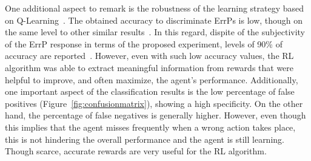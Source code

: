 \documentclass[journal]{IEEEtran}
\begin{document}
{{One additional aspect to remark is the robustness of the learning strategy based on Q-Learning~\cite{Bauer2015,Rubin2012}.   The obtained accuracy to discriminate ErrPs is low, though on the same level to other similar results~\cite{Iturrate2013,Ehrlich2016}.  In this regard, dispite of the subjectivity of the ErrP response in terms of the proposed experiment, levels of 90\% of accuracy are reported~\cite{Chavarriaga2014}.  However, even with such low accuracy values, the RL algorithm was able to extract meaningful information from rewards that were helpful to improve, and often maximize, the agent's performance.  Additionally, one important aspect of the classification results is the low percentage of false positives (Figure~\ref{fig:confusionmatrix}), showing a high specificity. On the other hand, the percentage of false negatives is generally higher.  However, even though this implies that the agent misses frequently when a wrong action takes place, this is not hindering the overall performance and the agent is still learning. Though scarce, accurate rewards are very useful for the RL algorithm.



}}
\end{document}
